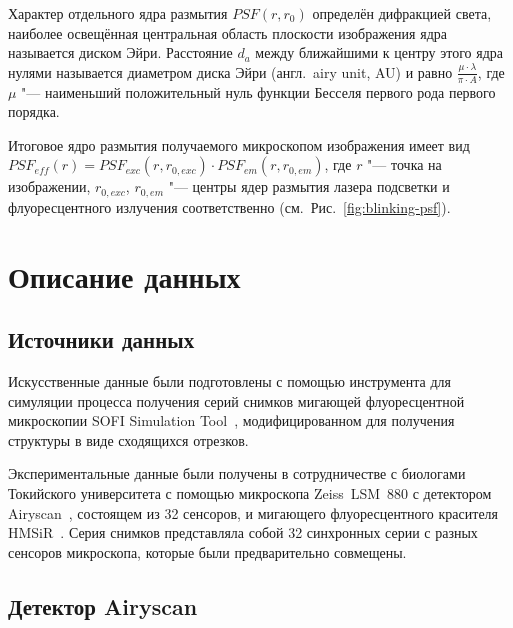 Характер отдельного ядра размытия $PSF\left(r, r_0\right)$ определён дифракцией света, наиболее освещённая центральная область плоскости изображения ядра называется диском Эйри. Расстояние $d_a$ между ближайшими к центру этого ядра нулями называется диаметром диска Эйри (англ.~airy unit, AU) и равно $\frac{\mu\cdot \lambda}{\pi \cdot A}$, где $\mu$ "--- наименьший положительный нуль функции Бесселя первого рода первого порядка.

Итоговое ядро размытия получаемого микроскопом изображения имеет вид $PSF_{eff}\left(r\right)=PSF_{exc}\left(r,r_{0,exc}\right)\cdot PSF_{em}\left(r,r_{0,em}\right)$, где $r$ "--- точка на изображении, $r_{0,exc}$, $r_{0,em}$ "--- центры ядер размытия лазера подсветки и флуоресцентного излучения соответственно (см.~Рис.~\ref{fig:blinking-psf}).

\section{Описание данных}

\subsection{Источники данных}

Искусственные данные были подготовлены с помощью инструмента для симуляции процесса получения серий снимков мигающей флуоресцентной микроскопии SOFI Simulation Tool~\cite{10.1371/journal.pone.0161602}, модифицированном для получения структуры в виде сходящихся отрезков.

Экспериментальные данные были получены в сотрудничестве с биологами Токийского университета с помощью микроскопа Zeiss~LSM~880 с детектором Airyscan~\cite{weisshart2014basic}, состоящем из 32 сенсоров, и мигающего флуоресцентного красителя HMSiR~\cite{uno2014spontaneously}. Серия снимков представляла собой 32 синхронных серии с разных сенсоров микроскопа, которые были предварительно совмещены.

\subsection{Детектор Airyscan}


